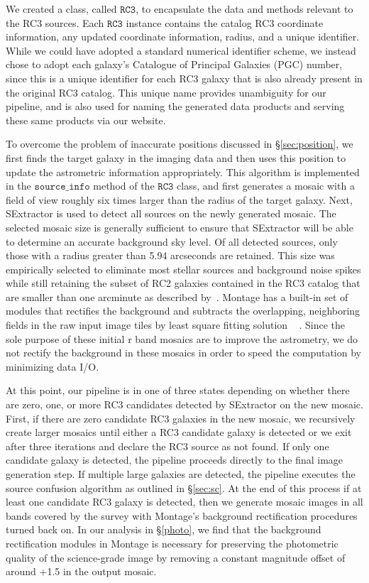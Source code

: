 \documentclass[authoryear, 12pt, 5p, times]{elsarticle}
\begin{document}
We created a class, called $\texttt{RC3}$, to encapsulate the data and methods relevant to the RC3 sources. Each $\texttt{RC3}$ instance contains the catalog RC3 coordinate information, any updated coordinate information, radius, and a unique identifier. While we could have adopted a standard numerical identifier scheme, we instead chose to adopt each galaxy's Catalogue of Principal Galaxies (PGC) number, since this is a unique identifier for each RC3 galaxy that is also already present in the original RC3 catalog. This unique name provides unambiguity for our pipeline, and is also used for naming the generated data products and serving these same products via our website.

To overcome the problem of inaccurate positions discussed in \S\ref{sec:position}, we first finds the target galaxy in the imaging data and then uses this position to update the astrometric information appropriately. This algorithm is implemented in the $\texttt{source\_info}$ method of the $\texttt{RC3}$ class, and first generates a mosaic with a field of view roughly six times larger than the radius of the target galaxy.  Next, SExtractor is used to detect all sources on the newly generated mosaic. The selected mosaic size is generally sufficient to ensure that SExtractor will be able to determine an accurate background sky level. Of all detected sources, only those with a radius greater than 5.94 arcseconds are retained. This size was empirically selected to eliminate most stellar sources and background noise spikes while still retaining the subset of RC2 galaxies contained in the RC3 catalog that are smaller than one arcminute as described by~\citealp{rc2}. Montage has a built-in set of modules that rectifies the background and subtracts the overlapping, neighboring fields in the raw input image tiles by least square fitting solution ~\citep{montage} . Since the sole purpose of these initial r band mosaics are to improve the astrometry, we do not rectify the background in these mosaics in order to speed the computation by minimizing data I/O.

At this point, our pipeline is in one of three states depending on whether there are zero, one, or more RC3 candidates detected by SExtractor on the new mosaic. First, if there are zero candidate RC3 galaxies in the new mosaic, we recursively create larger mosaics until either a RC3 candidate galaxy is detected or we exit after three iterations and declare the RC3 source as not found. If only one candidate galaxy is detected, the pipeline proceeds directly to the final image generation step. If multiple large galaxies are detected, the pipeline executes the source confusion algorithm as outlined in \S\ref{sec:sc}. At the end of this process if at least one candidate RC3 galaxy is detected, then we generate mosaic images in all bands covered by the survey with Montage's background rectification procedures turned back on. In our analysis in \S\ref{photo}, we find that the background rectification modules in Montage is necessary for preserving the photometric quality of the science-grade image by removing a constant magnitude offset of around +1.5 in the output mosaic. 
\end{document}
